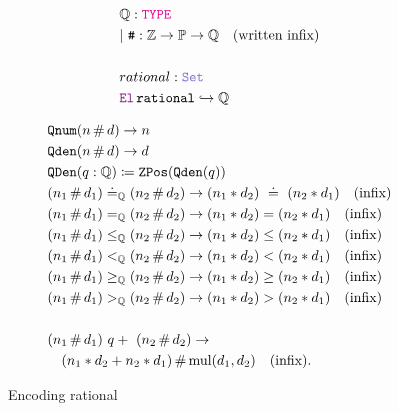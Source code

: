\begin{figure}
\begin{framed}
\begin{align*}
& \Q: \type \\
& |~\tt{\#}: \Z \ra \bb{P} \ra \Q{} \quad \text{(written infix)}\\
&\\
& rational: \set \\
& \el{}\,\tt{rational} \re \Q
\end{align*}

\noindent

\begin{align*}
&\texttt{Qnum}(n \,\#\, d) \rightarrow n \\
&\texttt{Qden}(n \,\#\, d) \rightarrow d \\
&\texttt{QDen}(q : \mathbb{Q}) \coloneq \mathop{\texttt{ZPos}}(\texttt{Qden}(q)) \\
&(n_1 \,\#\, d_1) \doteq_{\mathbb{Q}} (n_2 \,\#\, d_2) \rightarrow (n_1 * d_2)~\doteq~(n_2 * d_1) \quad \text{(infix)} \\
&(n_1 \,\#\, d_1) =_{\mathbb{Q}} (n_2 \,\#\, d_2) \rightarrow (n_1 * d_2) = (n_2 * d_1) \quad \text{(infix)} \\
&(n_1 \,\#\, d_1) \le_{\mathbb{Q}} (n_2 \,\#\, d_2) \rightarrow (n_1 * d_2) \le (n_2 * d_1) \quad \text{(infix)} \\
&(n_1 \,\#\, d_1) <_{\mathbb{Q}} (n_2 \,\#\, d_2) \rightarrow (n_1 * d_2) < (n_2 * d_1) \quad \text{(infix)} \\
&(n_1 \,\#\, d_1) \ge_{\mathbb{Q}} (n_2 \,\#\, d_2) \rightarrow (n_1 * d_2) \ge (n_2 * d_1) \quad \text{(infix)} \\
&(n_1 \,\#\, d_1)  >_{\mathbb{Q}} (n_2 \,\#\, d_2) \rightarrow (n_1 * d_2) > (n_2 * d_1) \quad \text{(infix)} \\
\\
&(n_1 \,\#\, d_1)~q+~(n_2 \,\#\, d_2) \rightarrow \\
& \quad (n_1 * d_2 + n_2 * d_1) \,\#\, \text{mul}(d_1, d_2) \quad \text{(infix)}. \\
\end{align*}
\end{framed}
\caption{Encoding rational}
\label{fig:rational-sort}
\end{figure}


